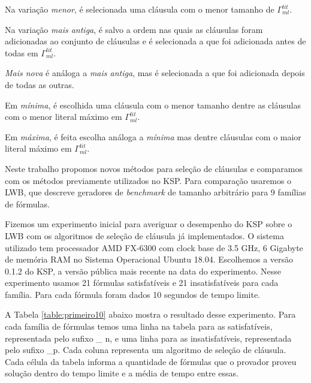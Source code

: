 Na variação \textit{menor}, é selecionada uma cláusula com o menor tamanho de $\Gamma^{lit}_{ml}$.

Na variação \textit{mais antiga}, é salvo a ordem nas quais as cláusulas foram adicionadas ao conjunto de cláusulas e é selecionada a que foi adicionada antes de todas em $\Gamma^{lit}_{ml}$.

\textit{Mais nova} é análoga a \textit{mais antiga}, mas é selecionada a que foi adicionada depois de todas as outras.

Em \textit{mínima}, é escolhida uma cláusula com o menor tamanho dentre as cláusulas com o menor literal máximo em $\Gamma^{lit}_{ml}$.

Em \textit{máxima}, é feita escolha análoga a \textit{mínima} mas dentre cláusulas com o maior literal máximo em $\Gamma^{lit}_{ml}$.

Neste trabalho propomos novos métodos para seleção de cláusulas e comparamos com os métodos previamente utilizados no KSP. Para comparação usaremos o LWB\cite{lwb}, que descreve geradores de \textit{benchmark} de tamanho arbitrário para 9 famílias de fórmulas.

Fizemos um experimento inicial para averiguar o desempenho do KSP sobre o LWB com os algoritmos de seleção de cláusula já implementados. O sistema utilizado tem processador AMD FX-6300 com clock base de 3.5 GHz, 6 Gigabyte de memória RAM no Sistema Operacional Ubuntu 18.04. Escolhemos a versão 0.1.2 do KSP, a versão pública mais recente na data do experimento. Nesse experimento usamos 21 fórmulas satisfatíveis e 21 insatisfatíveis para cada família. Para cada fórmula foram dados 10 segundos de tempo limite.

A Tabela \ref{table:primeiro10} abaixo mostra o resultado desse experimento. Para cada família de fórmulas temos uma linha na tabela para as satisfatíveis, representada pelo sufixo \_ n, e uma linha para as insatisfatíveis, representada pelo sufixo \_p. Cada coluna representa um algoritmo de seleção de cláusula. Cada célula da tabela informa a quantidade de fórmulas que o provador proveu solução dentro do tempo limite e a média de tempo entre essas.

